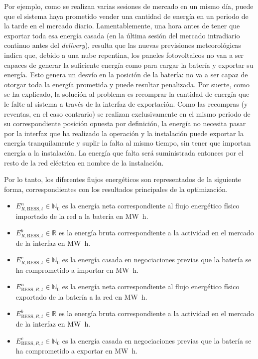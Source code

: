Por ejemplo, como se realizan varias sesiones de mercado en un mismo día, puede que el sistema haya prometido vender una cantidad de energía en un periodo de la tarde en el mercado diario. Lamentablemente, una hora antes de tener que exportar toda esa energía casada (en la última sesión del mercado intradiario continuo antes del \textit{delivery}), resulta que las nuevas previsiones meteorológicas indica que, debido a una nube repentina, los paneles fotovoltaicos no van a ser capaces de generar la suficiente energía como para cargar la batería y exportar su energía. Esto genera un desvío en la posición de la batería: no va a ser capaz de otorgar toda la energía prometida y puede resultar penalizada. Por suerte, como se ha explicado, la solución al problema es recomprar la cantidad de energía que le falte al sistema a través de la interfaz de exportación. Como las recompras (y reventas, en el caso contrario) se realizan exclusivamente en el mismo periodo de su correspondiente posición opuesta por definición, la energía no necesita pasar por la interfaz que ha realizado la operación y la instalación puede exportar la energía tranquilamente y suplir la falta al mismo tiempo, sin tener que importan energía a la instalación. La energía que falta será suministrada entonces por el resto de la red eléctrica en nombre de la instalación.

Por lo tanto, los diferentes flujos energéticos son representados de la siguiente forma, correspondientes con los resultados principales de la optimización.

\begin{itemize}

  \item \( E^{n}_{R, \text{BESS}, t} \in \mathbb{N}_{0} \) es la energía neta correspondiente al flujo energético físico importado de la red a la batería en \si{{\mega\watt\hour}}.

  \item \( E^{b}_{R, \text{BESS}, t} \in \mathbb{R} \) es la energía bruta correspondiente a la actividad en el mercado de la interfaz en \si{{\mega\watt\hour}}.

  \item \( E^{c}_{R, \text{BESS}, t} \in \mathbb{N}_{0} \) es la energía casada en negociaciones previas que la batería se ha comprometido a importar en \si{{\mega\watt\hour}}.

  \item \( E^{n}_{\text{BESS}, R, t} \in \mathbb{N}_{0} \) es la energía neta correspondiente al flujo energético físico exportado de la batería a la red en \si{{\mega\watt\hour}}.

  \item \( E^{b}_{\text{BESS}, R, t} \in \mathbb{R} \) es la energía bruta correspondiente a la actividad en el mercado de la interfaz en \si{{\mega\watt\hour}}.

  \item \( E^{c}_{\text{BESS}, R, t} \in \mathbb{N}_{0} \) es la energía casada en negociaciones previas que la batería se ha comprometido a exportar en \si{{\mega\watt\hour}}.

\end{itemize}

